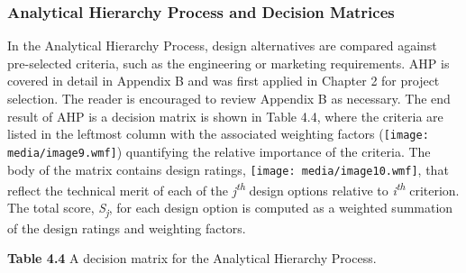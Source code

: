 \subsubsection{Analytical Hierarchy Process and Decision
Matrices}\label{analytical-hierarchy-process-and-decision-matrices}

In the Analytical Hierarchy Process, design alternatives are compared
against pre-selected criteria, such as the engineering or marketing
requirements. AHP is covered in detail in Appendix B and was first
applied in Chapter 2 for project selection. The reader is encouraged to
review Appendix B as necessary. The end result of AHP is a decision
matrix is shown in Table 4.4, where the criteria are listed in the
leftmost column with the associated weighting factors
(\texttt{[image: media/image9.wmf]}) quantifying the relative importance
of the criteria. The body of the matrix contains design ratings,
\texttt{[image: media/image10.wmf]}, that reflect the technical merit of
each of the \emph{j\textsuperscript{th}} design options relative to
\emph{i\textsuperscript{th}} criterion. The total score,
\emph{S\textsubscript{j}}, for each design option is computed as a
weighted summation of the design ratings and weighting factors.

\textbf{Table 4.4} A decision matrix for the Analytical Hierarchy
Process.

